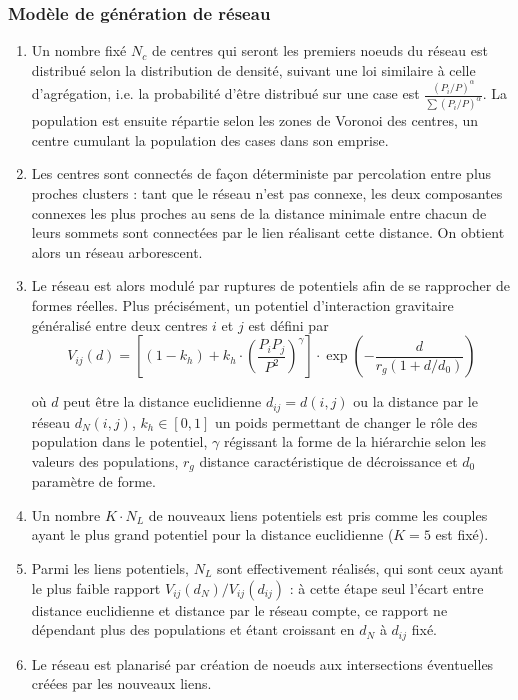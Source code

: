 \documentclass[french,11pt]{beamer}
\begin{document}
\begin{frame}[allowframebreaks]
\frametitle{Modèle de génération de réseau}
\footnotesize
\begin{enumerate}
\item Un nombre fixé $N_c$ de centres qui seront les premiers noeuds du réseau est distribué selon la distribution de densité, suivant une loi similaire à celle d'agrégation, i.e. la probabilité d'être distribué sur une case est $\frac{(P_i/P)^{\alpha}}{\sum (P_i/P)^{\alpha}}$. La population est ensuite répartie selon les zones de Voronoi des centres, un centre cumulant la population des cases dans son emprise.
\item Les centres sont connectés de façon déterministe par percolation entre plus proches clusters : tant que le réseau n'est pas connexe, les deux composantes connexes les plus proches au sens de la distance minimale entre chacun de leurs sommets sont connectées par le lien réalisant cette distance. On obtient alors un réseau arborescent.
\item Le réseau est alors modulé par ruptures de potentiels afin de se rapprocher de formes réelles. Plus précisément, un potentiel d'interaction gravitaire généralisé entre deux centres $i$ et $j$ est défini par
\[
V_{ij}(d) = \left[ (1 - k_h) + k_h \cdot \left( \frac{P_i P_j}{P^2} \right)^{\gamma} \right]\cdot \exp{\left( -\frac{d}{r_g (1 + d/d_0)} \right)}
\]

où $d$ peut être la distance euclidienne $d_{ij}=d(i,j)$ ou la distance par le réseau $d_N(i,j)$, $k_h \in [0,1]$ un poids permettant de changer le rôle des population dans le potentiel, $\gamma$ régissant la forme de la hiérarchie selon les valeurs des populations, $r_g$ distance caractéristique de décroissance et $d_0$ paramètre de forme.
\item Un nombre $K\cdot N_L$ de nouveaux liens potentiels est pris comme les couples ayant le plus grand potentiel pour la distance euclidienne ($K=5$ est fixé).
\item Parmi les liens potentiels, $N_L$ sont effectivement réalisés, qui sont ceux ayant le plus faible rapport $V_{ij}(d_N)/V_{ij}(d_{ij})$ : à cette étape seul l'écart entre distance euclidienne et distance par le réseau compte, ce rapport ne dépendant plus des populations et étant croissant en $d_N$ à $d_{ij}$ fixé.
\item Le réseau est planarisé par création de noeuds aux intersections éventuelles créées par les nouveaux liens.
\end{enumerate}

\end{frame}
\end{document}
